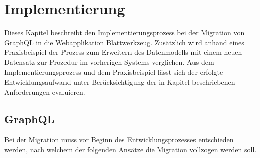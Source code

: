 

\chapter{Implementierung}
Dieses Kapitel beschreibt den Implementierungsprozess bei der Migration von GraphQL in die Webapplikation Blattwerkzeug. Zusätzlich wird anhand eines Praxisbeispiel der Prozess zum Erweitern des Datenmodells mit einem neuen Datensatz zur Prozedur im vorherigen Systems verglichen. Aus dem Implementierungsprozess und dem Praxisbeispiel lässt sich der erfolgte Entwicklungsaufwand unter Berücksichtigung der in Kapitel  beschriebenen Anforderungen evaluieren.

\section{GraphQL}
Bei der Migration muss vor Beginn des Entwicklungsprozesses entschieden werden, nach welchem der folgenden Ansätze die Migration vollzogen werden soll.

